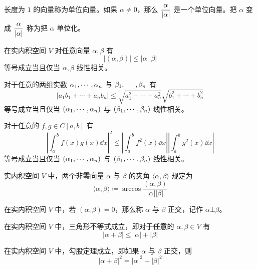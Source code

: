 长度为 $1$ 的向量称为单位向量。如果 $\alpha \ne 0$，那么 $\mfrac{\alpha}{|\alpha|}$ 是一个单位向量。把 $\alpha$ 变成 $\mfrac{\alpha}{|\alpha|}$ 称为把 $\alpha$ 单位化。

\begin{theorem}
    在实内积空间 $V$ 对任意向量 $\alpha,\beta$ 有
    \[ |(\alpha,\beta)| \leqslant |\alpha| |\beta| \]
    等号成立当且仅当 $\alpha,\beta$ 线性相关。
\end{theorem}

\begin{proposition}
    对于任意的两组实数 $\alpha_1,\cdots,\alpha_n$ 与  $\beta_1,\cdots,\beta_n$ 有
    \[ |a_1b_1 + \cdots + a_nb_n| \leqslant \sqrt{a_1^2 + \cdots + a_n^2}\sqrt{b_1^2 + \cdots + b_n^2} \]
    等号成立当且仅当 $(\alpha_1,\cdots,\alpha_n)$ 与 $(\beta_1,\cdots,\beta_n)$ 线性相关。
\end{proposition}

\begin{proposition}
    对于任意的 $f,g \in C[a,b]$ 有
    \[ \left| \int_a^b f(x)g(x) \dd x \right|^2 \leqslant \left| \int_a^b f^2(x) \dd x \right| \left| \int_a^b g^2(x) \dd x \right| \]
    等号成立当且仅当 $(\alpha_1,\cdots,\alpha_n)$ 与 $(\beta_1,\cdots,\beta_n)$ 线性相关。
\end{proposition}

\begin{definition}
    实内积空间 $V$ 中，两个非零向量 $\alpha$ 与 $\beta$ 的夹角 $\langle\alpha,\beta\rangle$ 规定为
    \[ \langle\alpha,\beta\rangle \coloneqq \arccos \frac{(\alpha,\beta)}{|\alpha||\beta|} \]
\end{definition}

\begin{definition}
    在实内积空间 $V$ 中，若 $(\alpha,\beta) = 0$，那么称 $\alpha$ 与 $\beta$ 正交，记作 $\alpha \bot \beta$。
\end{definition}

\begin{proposition}
    在实内积空间 $V$ 中，三角形不等式成立，即对于任意的 $\alpha,\beta \in V$ 有
    \[ |\alpha+\beta| \leqslant |\alpha| + |\beta| \]
\end{proposition}

\begin{proposition}
    在实内积空间 $V$ 中，勾股定理成立，即如果 $\alpha$ 与 $\beta$ 正交，则
    \[ |\alpha + \beta|^2 = |\alpha|^2 + |\beta|^2 \]
\end{proposition}

